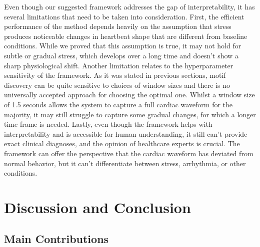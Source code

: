 \documentclass[conference,10pt]{IEEEtran}
\begin{document}
Even though our suggested framework addresses the gap of interpretability, it has several limitations that need to be taken into consideration.
First, the efficient performance of the method depends heavily on the assumption that stress produces noticeable changes in heartbeat shape that are different from baseline conditions. While we proved that this assumption is true, it may not hold for subtle or gradual stress, which develops over a long time and doesn’t show a sharp physiological shift.
Another limitation relates to the hyperparameter sensitivity of the framework. As it was stated in previous sections, motif discovery can be quite sensitive to choices of window sizes and there is no universally accepted approach for choosing the optimal one. Whilst a window size of 1.5 seconds allows the system to capture a full cardiac waveform for the majority, it may still struggle to capture some gradual changes, for which a longer time frame is needed.
Lastly, even though the framework helps with interpretability and is accessible for human understanding, it still can’t provide exact clinical diagnoses, and the opinion of healthcare experts is crucial. The framework can offer the perspective that the cardiac waveform has deviated from normal behavior, but it can’t differentiate between stress, arrhythmia, or other conditions. 

\section{Discussion and Conclusion}

\subsection{Main Contributions}
\end{document}
